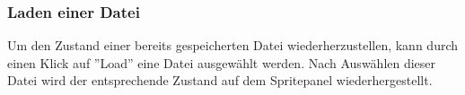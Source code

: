 \subsubsection{Laden einer Datei}

Um den Zustand einer bereits gespeicherten Datei wiederherzustellen, kann durch einen Klick auf ''Load'' eine Datei ausgewählt werden. Nach Auswählen dieser Datei wird der entsprechende Zustand auf dem Spritepanel wiederhergestellt.